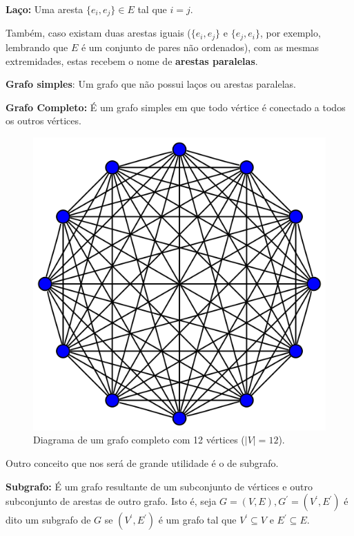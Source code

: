 \documentclass[a4paper,12pt]{article}
\begin{document}
\begin{center}
	\begin{minipage}{0.9 \linewidth}
		\textbf{Laço:} Uma aresta $\{e_i, e_j\} \in E$ tal que $i = j$.
	\end{minipage}
\end{center}

Também, caso existam duas arestas iguais ($\{e_i, e_j\}$ e 
$\{e_j, e_i\}$, por exemplo, lembrando que $E$ é um conjunto de pares não ordenados), com as mesmas extremidades, estas recebem o nome de \textbf{arestas paralelas}.

\begin{center}
	\begin{minipage}{0.9 \linewidth}
		\textbf{Grafo simples}: Um grafo que não possui laços ou arestas paralelas.
	\end{minipage}
\end{center}

\begin{center}
	\begin{minipage}{0.9 \linewidth}
		\textbf{Grafo Completo:} É um grafo simples em que todo vértice é conectado a todos os outros vértices.
	\end{minipage}
\end{center}

\begin{figure}[H]
	\begin{center}
		\includegraphics[width=0.4\linewidth]{grafocompleto.png}
	\end{center}
	\caption{Diagrama de um grafo completo com 12 vértices ($|V| = 12$).}
	\label{fig:grafocompleto}
\end{figure}

Outro conceito que nos será de grande utilidade é o de subgrafo.
\begin{center}
	\begin{minipage}{0.9 \linewidth}
		\textbf{Subgrafo:} É um grafo resultante de um subconjunto de vértices e outro subconjunto de arestas de outro grafo. Isto é, seja $G = (V, E), G^\prime = (V^\prime, E^\prime)$ é dito um subgrafo de $G$ se $(V^\prime, E^\prime)$ é um grafo tal que $V^\prime \subseteq V$ e $E^\prime \subseteq E$.
	\end{minipage}
\end{center}
\end{document}
